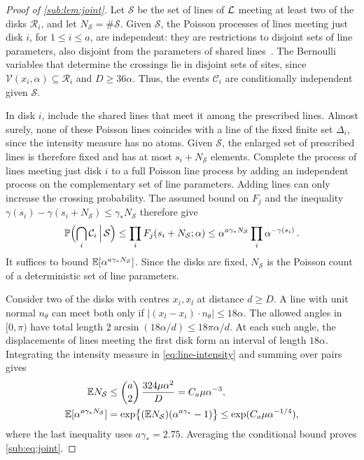 \documentclass[11pt,letterpaper]{article}
\newcommand{\cS}{\mathcal S}
\newcommand{\cC}{\mathcal C}
\begin{document}
\begin{proof}[Proof of \cref{sub:lem:joint}]
Let $\cS$ be the set of lines of $\mathcal L$ meeting at least two of the disks $\mathcal R_i$, and let $N_{\cS}=\#\cS$. Given $\cS$, the Poisson processes of lines meeting just disk $i$, for $1\le i\le a$, are independent: they are restrictions to disjoint sets of line parameters, also disjoint from the parameters of shared lines~\cite[Theorem~5.2]{LP17}. The Bernoulli variables that determine the crossings lie in disjoint sets of sites, since $\mathcal V(x_i,\alpha)\subseteq\mathcal R_i$ and $D\ge36\alpha$. Thus, the events $\cC_i$ are conditionally independent given $\cS$.

In disk $i$, include the shared lines that meet it among the prescribed lines. Almost surely, none of these Poisson lines coincides with a line of the fixed finite set $\Delta_i$, since the intensity measure has no atoms. Given $\cS$, the enlarged set of prescribed lines is therefore fixed and has at most $s_i+N_{\cS}$ elements. Complete the process of lines meeting just disk $i$ to a full Poisson line process by adding an independent process on the complementary set of line parameters. Adding lines can only increase the crossing probability. The assumed bound on $F_j$ and the inequality $\gamma(s_i)-\gamma(s_i+N_{\cS})\le\gamma_* N_{\cS}$ therefore give
\[
  \P\Bigl(\bigcap_i\cC_i\,\Big|\,\cS\Bigr)
  \le\prod_i F_j(s_i+N_{\cS};\alpha)
  \le \alpha^{a\gamma_* N_{\cS}}\prod_i\alpha^{-\gamma(s_i)}\,.
\]
It suffices to bound $\E[\alpha^{a\gamma_* N_{\cS}}]$. Since the disks are fixed, $N_{\cS}$ is the Poisson count of a deterministic set of line parameters.

Consider two of the disks with centres $x_i,x_l$ at distance $d\ge D$. A line with unit normal $n_\theta$ can meet both only if $\lvert(x_l-x_i)\cdot n_\theta\rvert\le18\alpha$. The allowed angles in $[0,\pi)$ have total length $2\arcsin(18\alpha/d)\le18\pi\alpha/d$. At each such angle, the displacements of lines meeting the first disk form an interval of length $18\alpha$. Integrating the intensity measure in \eqref{eq:line-intensity} and summing over pairs gives
\begin{align*}
   \E N_{\cS} &\le\binom a2\,\frac{324\mu\alpha^2}{D}
          =C_a\mu\alpha^{-3},\\
   \E[\alpha^{a\gamma_*N_{\cS}}]
        &=\exp\bigl\{(\E N_{\cS})(\alpha^{a\gamma_*}-1)\bigr\}
          \le\exp(C_a\mu\alpha^{-1/4}),
\end{align*}
where the last inequality uses $a\gamma_*=2.75$. Averaging the conditional bound proves \eqref{sub:eq:joint}.
\end{proof}
\end{document}
